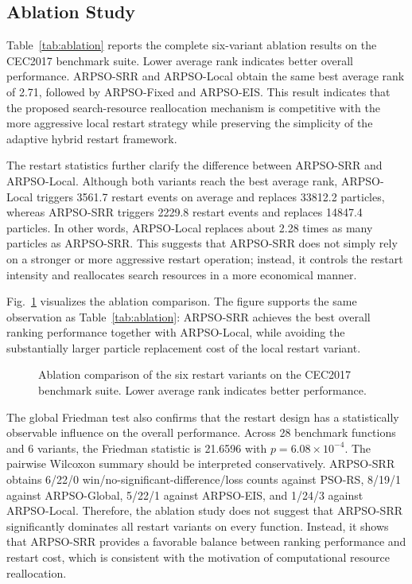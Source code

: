 \subsection{Ablation Study}
Table~\ref{tab:ablation} reports the complete six-variant ablation results on the CEC2017 benchmark suite. Lower average rank indicates better overall performance. ARPSO-SRR and ARPSO-Local obtain the same best average rank of 2.71, followed by ARPSO-Fixed and ARPSO-EIS. This result indicates that the proposed search-resource reallocation mechanism is competitive with the more aggressive local restart strategy while preserving the simplicity of the adaptive hybrid restart framework.



The restart statistics further clarify the difference between ARPSO-SRR and ARPSO-Local. Although both variants reach the best average rank, ARPSO-Local triggers 3561.7 restart events on average and replaces 33812.2 particles, whereas ARPSO-SRR triggers 2229.8 restart events and replaces 14847.4 particles. In other words, ARPSO-Local replaces about 2.28 times as many particles as ARPSO-SRR. This suggests that ARPSO-SRR does not simply rely on a stronger or more aggressive restart operation; instead, it controls the restart intensity and reallocates search resources in a more economical manner.

Fig.~\ref{fig:ablation} visualizes the ablation comparison. The figure supports the same observation as Table~\ref{tab:ablation}: ARPSO-SRR achieves the best overall ranking performance together with ARPSO-Local, while avoiding the substantially larger particle replacement cost of the local restart variant.

\begin{figure}[!t]
    \centering
    \caption{Ablation comparison of the six restart variants on the CEC2017 benchmark suite. Lower average rank indicates better performance.}
    \label{fig:ablation}
\end{figure}

The global Friedman test also confirms that the restart design has a statistically observable influence on the overall performance. Across 28 benchmark functions and 6 variants, the Friedman statistic is 21.6596 with $p=6.08\times 10^{-4}$. The pairwise Wilcoxon summary should be interpreted conservatively. ARPSO-SRR obtains 6/22/0 win/no-significant-difference/loss counts against PSO-RS, 8/19/1 against ARPSO-Global, 5/22/1 against ARPSO-EIS, and 1/24/3 against ARPSO-Local. Therefore, the ablation study does not suggest that ARPSO-SRR significantly dominates all restart variants on every function. Instead, it shows that ARPSO-SRR provides a favorable balance between ranking performance and restart cost, which is consistent with the motivation of computational resource reallocation.

